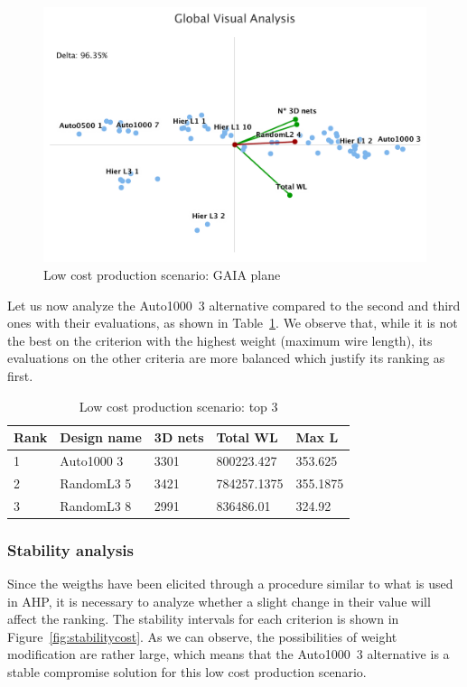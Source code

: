 \documentclass{svmult}
\begin{document}
\begin{figure}[h!]
    \centering
    \includegraphics[width=\linewidth]{gaiacost}
    \caption{Low cost production scenario: GAIA plane}
    \label{fig:gaiacost}
\end{figure}

Let us now analyze the Auto1000~3 alternative compared to the second and third ones with their evaluations, as shown in Table~\ref{tab:top3cost}. We observe that, while it is not the best on the criterion with the highest weight (maximum wire length), its evaluations on the other criteria are more balanced which justify its ranking as first.

\begin{table}[h!]
    \begin{center}
        \caption{Low cost production scenario: top 3}
        \label{tab:top3cost}
        \begin{tabular}{p{1.2cm}p{2.3cm}p{1.5cm}p{2cm}p{1.3cm}}
            \hline
            Rank & Design name & 3D nets & Total WL & Max L\\
            \hline
            1 & Auto1000 3 & 3301 & 800223.427 & 353.625 \\
            2 & RandomL3 5 & 3421 & 784257.1375 & 355.1875 \\
            3 & RandomL3 8 & 2991 & 836486.01 & 324.92 \\
            \hline
        \end{tabular}
    \end{center}
\end{table}

\subsubsection*{Stability analysis}
Since the weigths have been elicited through a procedure similar to what is used in AHP, it is necessary to analyze whether a slight change in their value will affect the ranking. The stability intervals for each criterion is shown in Figure~\ref{fig:stabilitycost}. As we can observe, the possibilities of weight modification are rather large, which means that the Auto1000~3 alternative is a stable compromise solution for this low cost production scenario.
\end{document}
